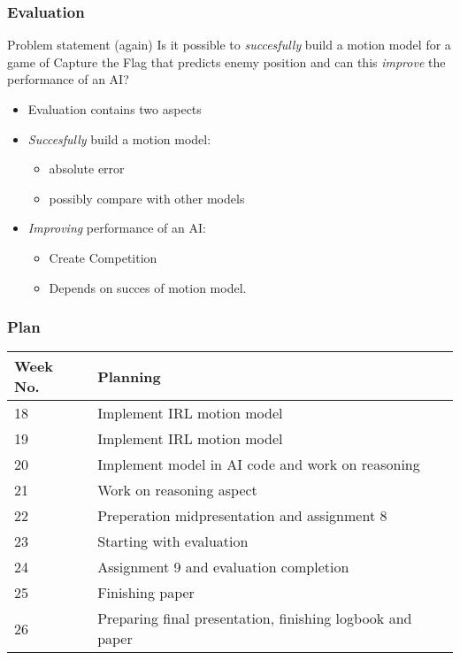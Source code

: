 \documentclass{beamer}
\begin{document}
\begin{frame}
\frametitle{Evaluation}
\begin{block}{Problem statement (again)}
Is it possible to \emph{succesfully} build a motion model for a game of Capture the Flag that predicts enemy
position and can this \emph{improve} the performance of an AI?
\end{block}
\begin{itemize}
    \item Evaluation contains two aspects
    \item \emph{Succesfully} build a motion model:
        \begin{itemize}
            \item absolute error
            \item possibly compare with other models
        \end{itemize}
    \item \emph{Improving} performance of an AI:
        \begin{itemize}
            \item Create Competition
            \item Depends on succes of motion model.
        \end{itemize}
\end{itemize}
\end{frame}

\begin{frame}
\frametitle{Plan}
\begin{table}
\centering
    \begin{tabular}{| l | l |}
      \hline                        
      Week No. & Planning \\
      \hline
      \hline
      18 &  Implement IRL motion model \\
      \hline
      19 &  Implement IRL motion model \\
      \hline
      20 &  Implement model in AI code and work on reasoning\\
      \hline
      21 &  Work on reasoning aspect \\
      \hline
      22 &  Preperation midpresentation and assignment 8\\
      \hline
      23 &  Starting with evaluation\\
      \hline
      24 &  Assignment 9 and evaluation completion \\
      \hline
      25 &  Finishing paper \\
      \hline
      26 &  Preparing final presentation, finishing logbook and paper \\
      \hline
    \end{tabular}
\end{table}
\end{frame}



\end{document}
